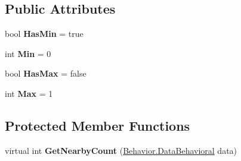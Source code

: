 \subsection*{Public Attributes}
\begin{DoxyCompactItemize}
\item 
\hypertarget{class_skyrates_1_1_a_i_1_1_state_1_1_transition_1_1_transition_detected_nearby_targets_a3c1a9671df2a6be26b180dc8e1787de6}{bool {\bfseries Has\-Min} = true}\label{class_skyrates_1_1_a_i_1_1_state_1_1_transition_1_1_transition_detected_nearby_targets_a3c1a9671df2a6be26b180dc8e1787de6}

\item 
\hypertarget{class_skyrates_1_1_a_i_1_1_state_1_1_transition_1_1_transition_detected_nearby_targets_ad8ab43d7354440602528964029fc1993}{int {\bfseries Min} = 0}\label{class_skyrates_1_1_a_i_1_1_state_1_1_transition_1_1_transition_detected_nearby_targets_ad8ab43d7354440602528964029fc1993}

\item 
\hypertarget{class_skyrates_1_1_a_i_1_1_state_1_1_transition_1_1_transition_detected_nearby_targets_a3cdf06bb40c5a3997f5824c4cd7ea7a0}{bool {\bfseries Has\-Max} = false}\label{class_skyrates_1_1_a_i_1_1_state_1_1_transition_1_1_transition_detected_nearby_targets_a3cdf06bb40c5a3997f5824c4cd7ea7a0}

\item 
\hypertarget{class_skyrates_1_1_a_i_1_1_state_1_1_transition_1_1_transition_detected_nearby_targets_acf7c31da5f10d76d012a04738368fc6c}{int {\bfseries Max} = 1}\label{class_skyrates_1_1_a_i_1_1_state_1_1_transition_1_1_transition_detected_nearby_targets_acf7c31da5f10d76d012a04738368fc6c}

\end{DoxyCompactItemize}
\subsection*{Protected Member Functions}
\begin{DoxyCompactItemize}
\item 
\hypertarget{class_skyrates_1_1_a_i_1_1_state_1_1_transition_1_1_transition_detected_nearby_targets_a8fb2de765b8e258a900f2f8c3b673015}{virtual int {\bfseries Get\-Nearby\-Count} (\hyperlink{class_skyrates_1_1_a_i_1_1_behavior_1_1_data_behavioral}{Behavior.\-Data\-Behavioral} data)}\label{class_skyrates_1_1_a_i_1_1_state_1_1_transition_1_1_transition_detected_nearby_targets_a8fb2de765b8e258a900f2f8c3b673015}

\end{DoxyCompactItemize}


